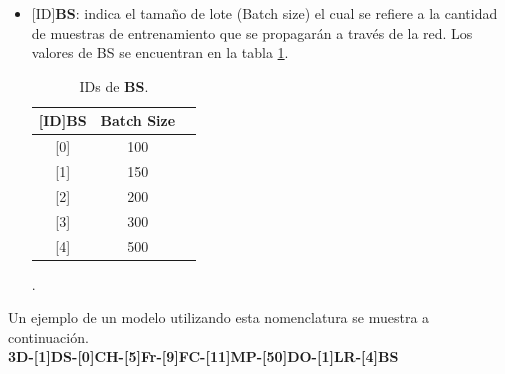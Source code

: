 \begin{onehalfspacing}
\begin{itemize}
      \item  {[ID]\textbf{BS}}: indica el tamaño de lote (Batch size) el cual se refiere a la cantidad de muestras de entrenamiento que se propagarán a través de la red. Los valores de BS se encuentran en la tabla \ref{tab:BS}.
      \begin{table}[h!]
        \centering
        \begin{tabular}{|c|c|c|}
            \hline 
            {[}ID{]}BS & Batch Size\tabularnewline
            \hline 
            \hline 
            {[}0{]} & 100\tabularnewline
            \hline 
            {[}1{]} & 150\tabularnewline
            \hline 
            {[}2{]} & 200\tabularnewline
            \hline 
            {[}3{]} & 300\tabularnewline
            \hline 
            {[}4{]} & 500\tabularnewline
            \hline 
        \end{tabular}%
        \caption{\footnotesize  IDs de \textbf{BS}.}.
        \label{tab:BS}
      \end{table} 
\end{itemize}

Un ejemplo de un modelo utilizando esta nomenclatura se muestra a continuación.\\

\textbf{3D-[1]DS-[0]CH-[5]Fr-[9]FC-[11]MP-[50]DO-[1]LR-[4]BS}\\
 

\end{onehalfspacing}
